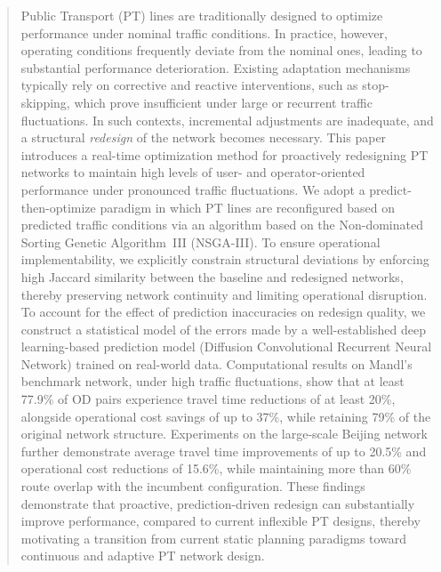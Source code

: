 \documentclass[a4paper,fleqn]{cas-sc}
\begin{document}
\begin{abstract}
Public Transport (PT) lines are traditionally designed to optimize performance under nominal traffic conditions. In practice, however, operating conditions frequently deviate from the nominal ones, leading to substantial performance deterioration. Existing adaptation mechanisms typically rely on corrective and reactive interventions, such as stop-skipping, which prove insufficient under large or recurrent traffic fluctuations. In such contexts, incremental adjustments are inadequate, and a structural \emph{redesign} of the network becomes necessary.
%
This paper introduces a real-time optimization method for proactively redesigning PT networks to maintain high levels of user- and operator-oriented performance under pronounced traffic fluctuations. We adopt a predict-then-optimize paradigm in which PT lines are reconfigured based on predicted traffic conditions via an algorithm based on the Non-dominated Sorting Genetic Algorithm~III (NSGA-III).
%
To ensure operational implementability, we explicitly constrain structural deviations by enforcing high Jaccard similarity between the baseline and redesigned networks, thereby preserving network continuity and limiting operational disruption. To account for the effect of prediction inaccuracies on redesign quality, we construct a statistical model of the errors made by a well-established deep learning-based prediction model (Diffusion Convolutional Recurrent Neural Network) trained on real-world data.
%
Computational results on Mandl's benchmark network, under high traffic fluctuations, show that at least 77.9\% of OD pairs experience travel time reductions of at least 20\%, alongside operational cost savings of up to 37\%, while retaining 79\% of the original network structure. Experiments on the large-scale Beijing network further demonstrate average travel time improvements of up to 20.5\% and operational cost reductions of 15.6\%, while maintaining more than 60\% route overlap with the incumbent configuration.
%
These findings demonstrate that proactive, prediction-driven redesign can substantially improve performance, compared to current inflexible PT designs, thereby motivating a transition from current static planning paradigms toward continuous and adaptive PT network design.
\end{abstract}

\end{document}
